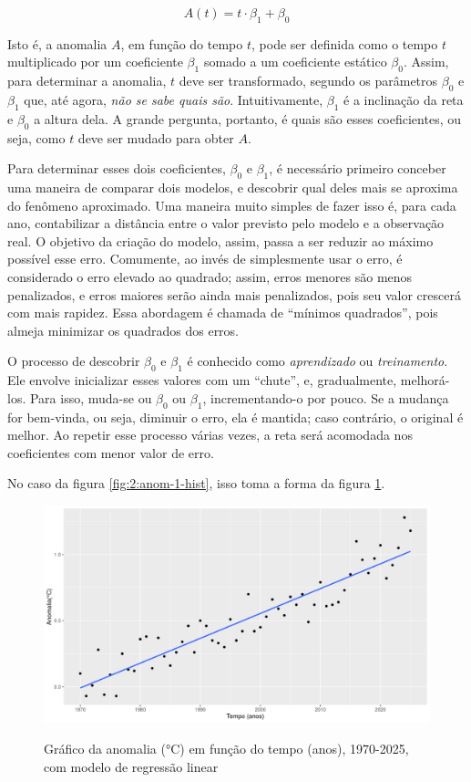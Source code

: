 \begin{equation}
A(t) = t\cdot\beta_1 + \beta_0
\end{equation}

Isto é, a anomalia $A$, em função do tempo $t$, pode ser definida como o tempo $t$ multiplicado por um coeficiente $\beta_1$ somado a um coeficiente estático $\beta_0$.
Assim, para determinar a anomalia, $t$ deve ser transformado, segundo os parâmetros $\beta_0$ e $\beta_1$ que, até agora, \textit{não se sabe quais são}.
Intuitivamente, $\beta_1$ é a inclinação da reta e $\beta_0$ a altura dela.
A grande pergunta, portanto, é quais são esses coeficientes, ou seja, como $t$ deve ser mudado para obter $A$.

Para determinar esses dois coeficientes, $\beta_0$ e $\beta_1$, é necessário primeiro conceber uma maneira de comparar dois modelos, e descobrir qual deles mais se aproxima do fenômeno aproximado.
Uma maneira muito simples de fazer isso é, para cada ano, contabilizar a distância entre o valor previsto pelo modelo e a observação real.
O objetivo da criação do modelo, assim, passa a ser reduzir ao máximo possível esse erro.
Comumente, ao invés de simplesmente usar o erro, é considerado o erro elevado ao quadrado; assim, erros menores são menos penalizados, e erros maiores serão ainda mais penalizados, pois seu valor crescerá com mais rapidez.
Essa abordagem é chamada de ``mínimos quadrados'', pois almeja minimizar os quadrados dos erros.

O processo de descobrir $\beta_0$ e $\beta_1$ é conhecido como \textit{aprendizado} ou \textit{treinamento}.
Ele envolve inicializar esses valores com um ``chute'', e, gradualmente, melhorá-los.
Para isso, muda-se ou $\beta_0$ ou $\beta_1$, incrementando-o por pouco. 
Se a mudança for bem-vinda, ou seja, diminuir o erro, ela é mantida; caso contrário, o original é melhor.
Ao repetir esse processo várias vezes, a reta será acomodada nos coeficientes com menor valor de erro.

No caso da figura \ref{fig:2:anom-1-hist}, isso toma a forma da figura \ref{fig:2:anom-3-scatter+reg}.

\begin{figure}
    \centering
    \caption{Gráfico da anomalia (°C) em função do tempo (anos), 1970-2025, com modelo de regressão linear}
    \includegraphics[width=\linewidth]{static/R/plot/anom-3-scatter+reg.png}
    \label{fig:2:anom-3-scatter+reg}
\end{figure}

